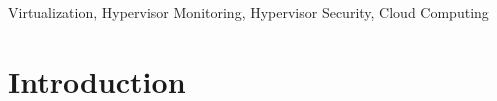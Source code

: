 \documentclass[conference]{IEEEtran}
\begin{document}
\begin{IEEEkeywords}
Virtualization, Hypervisor Monitoring, Hypervisor Security, Cloud Computing
\end{IEEEkeywords}

\section{Introduction}

%
%
%
%
\end{document}
